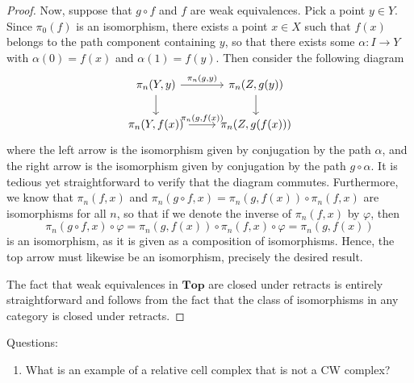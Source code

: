 \documentclass{amsart}
\theoremstyle{plain}
\theoremstyle{definition}
\newcommand{\Top}{\mbf{Top}}
\newcommand{\0}{\mathbf{0}}
\newcommand{\mbf}[1]{\mathbf{#1}}
\renewcommand{\(}{\left(}
\renewcommand{\)}{\right)}
\begin{document}
\begin{proof}
  Now, suppose that $g\circ f$ and $f$ are weak equivalences. Pick a point $y\in Y$. Since $\pi_0(f)$ is an isomorphism, there exists a point $x\in X$ such that $f(x)$ belongs to the path component containing $y$, so that there exists some $\alpha:I\to Y$ with $\alpha(0)=f(x)$ and $\alpha(1)=f(y)$. Then consider the following diagram
  \[\begin{tikzcd}
    {\pi_n(Y,y)} & {\pi_n(Z,g(y))} \\
    {\pi_n(Y,f(x))} & {\pi_n(Z,g(f(x)))}
    \arrow["{\pi_n(g,y)}", from=1-1, to=1-2]
    \arrow[from=1-1, to=2-1]
    \arrow["{\pi_n(g,f(x))}", from=2-1, to=2-2]
    \arrow[from=1-2, to=2-2]
  \end{tikzcd}\]
  where the left arrow is the isomorphism given by conjugation by the path $\alpha$, and the right arrow is the isomorphism given by conjugation by the path $g\circ\alpha$. It is tedious yet straightforward to verify that the diagram commutes.
  Furthermore, we know that $\pi_n(f,x)$ and $\pi_n(g\circ f,x)=\pi_n(g,f(x))\circ\pi_n(f,x)$ are isomorphisms for all $n$, so that if we denote the inverse of $\pi_n(f,x)$ by $\varphi$, then
  \[\pi_n(g\circ f,x)\circ\varphi=\pi_n(g,f(x))\circ\pi_n(f,x)\circ\varphi=\pi_n(g,f(x))\]
  is an isomorphism, as it is given as a composition of isomorphisms. Hence, the top arrow must likewise be an isomorphism, precisely the desired result.

  The fact that weak equivalences in $\Top$ are closed under retracts is entirely straightforward and follows from the fact that the class of isomorphisms in any category is closed under retracts.
\end{proof}

Questions:\begin{enumerate}
  \item What is an example of a relative cell complex that is not a CW complex?
\end{enumerate}
\end{document}
